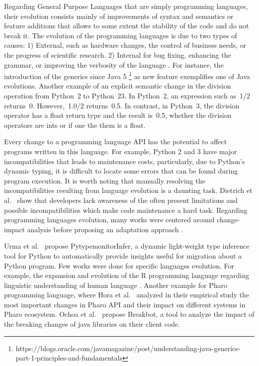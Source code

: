 Regarding General Purpose Languages that are simply programming languages, their evolution consists mainly of improvements of syntax and semantics or feature additions that allows to some extent the stability of the code and do not break it.
 The evolution of the programming languages is due to two types of causes: 1) External, such as hardware changes, the control of business needs, or the progress of scientific research. 2) Internal for bug fixing, enhancing the grammar, or improving the verbosity of the language \cite{urma2017programming}.
 For instance, the introduction of the generics since Java 5 \footnote{https://blogs.oracle.com/javamagazine/post/understanding-java-generics-part-1-principles-and-fundamentals} as new feature exemplifies one of Java evolutions. Another example of an explicit semantic change in the division operation from Python~2 to Python~23. In Python~2, an expression such as~1/2 returns~0. However,~1.0/2 returns~0.5. In contrast, in Python~3, the division operator has a float return type and the result is~0.5, whether the division operators are ints or if one the them is a float.
 
 Every change to a programming language API has the potential to affect programs written in this language. 
 For example, Python 2 and 3 have major incompatibilities that leads to maintenance costs, particularly, due to Python’s dynamic typing, it is difficult to locate some errors that can  be found during program execution.
 It is worth noting that manually resolving the incompatibilities resulting from language evolution is a daunting task.
Dietrich et al.~\cite{dietrich2016java} show that developers lack awareness of the 
 often present limitations and possible incompatibilities which make code maintenance a hard task.
Regarding programming languages evolution, many works were centered around change-impact analysis before proposing an adaptation approach \cite{arnold1996software,ren2004chianti,ryder2001change}.

 
 Urma et al.~\cite{urma2017programming} propose PytypemonitorInfer, a dynamic light-weight type inference tool for Python to automatically provide insights useful for migration about a Python program. Few works were done for specific languages evolution. For example, the expansion and evolution of the R programming language regarding linguistic understanding of human language \cite{urma2017programming}.
Another example for Pharo programming language, where Hora et al.~\cite{7332471} analyzed in their empirical study the most important changes in Pharo API and their impact on different systems in Pharo ecosystem.
Ochoa et al.~\cite{10.1145/3510455.3512783} propose Breakbot, a tool to analyze the impact of  the breaking changes of java libraries on their client code.

